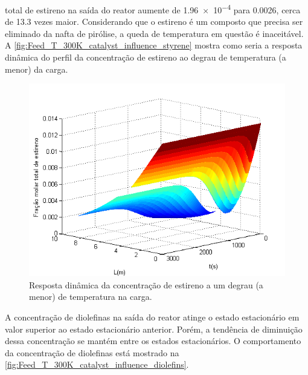 total de estireno na saída do reator aumente de \num{1,96e-4} para \num{0,0026},
cerca de \num{13,3} vezes maior. Considerando que o estireno é um composto que
precisa ser eliminado da nafta de pirólise, a queda de temperatura em questão é
inaceitável. A \autoref{fig:Feed_T_300K_catalyst_influence_styrene} mostra como
seria a resposta dinâmica do perfil da concentração de estireno ao degrau de
temperatura (a menor) da carga.
\begin{figure}[htb]
\centering
\includegraphics[scale=0.8]{images/Chap4/Feed_T_300K_catalyst_influence_styrene.png}
\caption{Resposta dinâmica da concentração de estireno a um degrau (a menor) de
temperatura na carga.}
\label{fig:Feed_T_300K_catalyst_influence_styrene}
\end{figure}

A concentração de diolefinas na saída do reator atinge o estado estacionário em
valor superior ao estado estacionário anterior. Porém, a tendência de diminuição
dessa concentração se mantém entre os estados estacionários. O comportamento da
concentração de diolefinas está mostrado na
\autoref{fig:Feed_T_300K_catalyst_influence_diolefins}.
 

